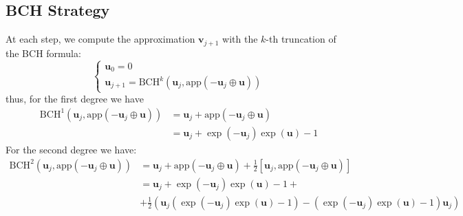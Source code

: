 \subsection{BCH Strategy}
At each step, we compute the approximation $\mathbf{v}_{j+1}$ with the $k$-th truncation of the BCH formula:
\begin{equation}\label{eq:bossa_strat}
\begin{cases}
\mathbf{u}_0 = 0 \\
\mathbf{u}_{j+1} = \text{BCH}^{k}(\mathbf{u}_{j}, \text{app}(-\mathbf{u}_{j}  \oplus  \mathbf{u} ))
\end{cases}
\end{equation}
thus, for the first degree we have 
\begin{align*}
\text{BCH}^{1}(\mathbf{u}_{j}, \text{app}(-\mathbf{u}_{j}  \oplus  \mathbf{u} ))
&=
\mathbf{u}_{j} +  \text{app}(-\mathbf{u}_{j}  \oplus  \mathbf{u} )\\
&=
\mathbf{u}_{j} + \exp(-\mathbf{u}_{j}) \exp( \mathbf{u})  - 1
\end{align*}
For the second degree we have:
\begin{align*}
\text{BCH}^{2}(\mathbf{u}_{j}, \text{app}(-\mathbf{u}_{j}  \oplus  \mathbf{u} ))
&=
\mathbf{u}_{j} +  \text{app}(-\mathbf{u}_{j}  \oplus  \mathbf{u} ) + \frac{1}{2}[\mathbf{u}_{j},  \text{app}(-\mathbf{u}_{j}  \oplus  \mathbf{u} )]\\
&=
\mathbf{u}_{j} + \exp(-\mathbf{u}_{j}) \exp( \mathbf{u})  - 1 + \\
&+ \frac{1}{2}(  \mathbf{u}_{j}( \exp(-\mathbf{u}_{j}) \exp( \mathbf{u})  - 1) -  ( \exp(-\mathbf{u}_{j}) \exp( \mathbf{u})  - 1)\mathbf{u}_{j})
\end{align*}


